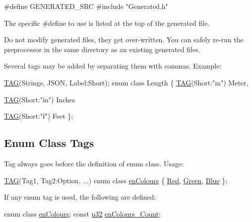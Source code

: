 \begin{DoxyCode}
\textcolor{preprocessor}{#define GENERATED\_SRC}
\textcolor{preprocessor}{#include "Generated.h"}
\end{DoxyCode}
 The specific {\ttfamily \#define} to use is listed at the top of the generated file.

Do not modify generated files, they get over-\/written. You can safely re-\/run the preprocessor in the same directory as an existing generated files.

Several tags may be added by separating them with commas. Example\+:


\begin{DoxyCode}
\hyperlink{Generated__001_8h_ad9b15e5b6d9b1ed55b76d9916ff6dec2}{TAG}(Strings, JSON, Label:Short);
\textcolor{keyword}{enum class} Length
\{   
    \hyperlink{ParsedC_8h_a542930d5f2f117ff1e21206f2baa51c5ae444f73956e5b2a401eb9471db89e7c9}{TAG}(Short:\textcolor{stringliteral}{"m"})
    Meter,

    \hyperlink{ParsedC_8h_a542930d5f2f117ff1e21206f2baa51c5ae444f73956e5b2a401eb9471db89e7c9}{TAG}(Short:\textcolor{stringliteral}{"in"})
    Inches

    \hyperlink{ParsedC_8h_a542930d5f2f117ff1e21206f2baa51c5ae444f73956e5b2a401eb9471db89e7c9}{TAG}(Short:\textcolor{stringliteral}{"f"})
    Feet
\};
\end{DoxyCode}


\subsection*{Enum Class Tags}

Tag always goes before the definition of {\ttfamily enum class}. Usage\+: 
\begin{DoxyCode}
\hyperlink{Generated__001_8h_ad9b15e5b6d9b1ed55b76d9916ff6dec2}{TAG}(Tag1, Tag2:Option, ...)
enum class \hyperlink{PreprocTest_8h_a081cf1a0e70d6e2bd48c98f457742877}{enColours}
\{
    \hyperlink{PreprocTest_8h_a081cf1a0e70d6e2bd48c98f457742877aee38e4d5dd68c4e440825018d549cb47}{Red},
    \hyperlink{PreprocTest_8h_a081cf1a0e70d6e2bd48c98f457742877ad382816a3cbeed082c9e216e7392eed1}{Green},
    \hyperlink{PreprocTest_8h_a081cf1a0e70d6e2bd48c98f457742877a9594eec95be70e7b1710f730fdda33d9}{Blue}
\};
\end{DoxyCode}


If any enum tag is used, the following are defined\+: 
\begin{DoxyCode}
\textcolor{keyword}{enum class} \hyperlink{PreprocTest_8h_a081cf1a0e70d6e2bd48c98f457742877}{enColours};
\textcolor{keyword}{const} \hyperlink{ab__common_8h_afaa62991928fb9fb18ff0db62a040aba}{u32} \hyperlink{Generated__Test_8h_abd85a89ac29df78a4d1b078c54016c79}{enColours\_Count};
\end{DoxyCode}


